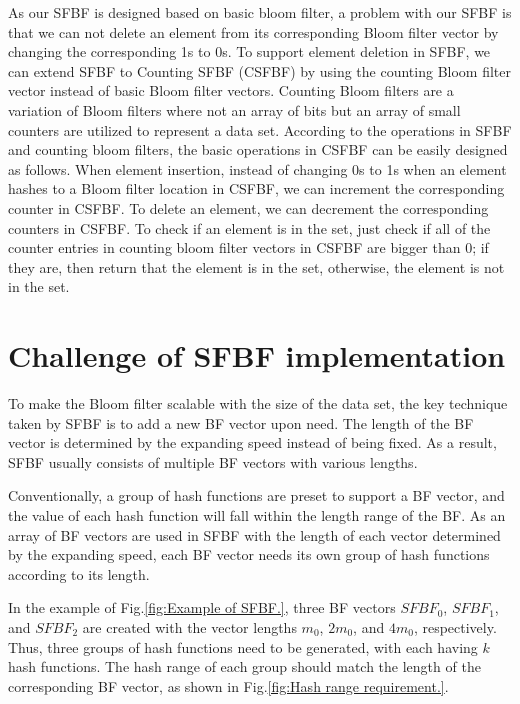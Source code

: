 \documentclass[10pt,journal,compsoc]{IEEEtran}
\newcommand{\rev}[1]{#1}
\begin{document}
\rev{As our SFBF is designed based on basic bloom filter, a problem with our SFBF is that we can not delete an element from its  corresponding Bloom filter vector by changing the corresponding 1s to 0s. %
To support element deletion in SFBF, we can extend SFBF to Counting SFBF (CSFBF) by using the counting Bloom filter vector instead of basic Bloom filter vectors. Counting Bloom filters are a variation of Bloom filters where  not  an array of bits but an array of small counters are utilized to represent a data set. According to the operations in SFBF and counting bloom filters, the basic operations in CSFBF can be easily designed as follows. When element insertion, instead of changing 0s to 1s when an element hashes to a Bloom filter location in CSFBF, we can increment the corresponding  counter in CSFBF. To delete an element, we can decrement the corresponding counters in CSFBF. To check if an element is in the set,  just check if all of the counter entries in counting bloom filter vectors in CSFBF are bigger than 0; if they are, then  return that the element is in the set, otherwise,  the element is not in the set.}
\section{Challenge of SFBF implementation}
\label{sec:Challenge in SFBF}
To make the Bloom filter scalable with the size of the data set, the key technique taken by SFBF is to add a new BF vector upon need. The length of the BF vector is determined by the expanding speed instead of being fixed.
  As a result, SFBF usually consists of multiple BF vectors with various lengths. %


Conventionally, a group of hash functions are preset to support a BF vector, and the value of each hash function will fall within the length range of the BF. As an array of BF vectors are used in SFBF with the length of each vector determined by the expanding speed, each BF vector needs its own group of hash functions according to its length.

In the example of Fig.\ref{fig:Example of SFBF.}, three BF vectors $SFBF_0$, $SFBF_1$, and $SFBF_2$ are created with the vector lengths $m_0$, $2m_0$, and $4m_0$, respectively. Thus, three groups of hash functions need to be generated, with each having $k$ hash functions. The hash range of each group should match the length of the corresponding BF vector, as shown in Fig.\ref{fig:Hash range requirement.}.
\end{document}
